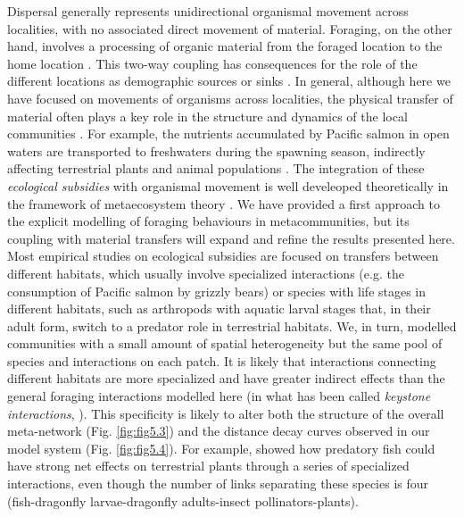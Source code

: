Dispersal generally represents unidirectional organismal movement across localities, with no associated direct movement of material. Foraging, on the other hand, involves a processing of organic material from the foraged location to the home location \citep{Gounand2018}. This two-way coupling has consequences for the role of the different locations as demographic sources or sinks \citep{Gravel2010}. In general, although here we have focused on movements of organisms across localities, the physical transfer of material often plays a key role in the structure and dynamics of the local communities \citep{Polis1997}. For example, the nutrients accumulated by Pacific salmon in open waters are transported to freshwaters during the spawning season, indirectly affecting terrestrial plants and animal populations \citep{Naiman2002, Levi2012}. The integration of these \textit{ecological subsidies} with organismal movement is well develeoped theoretically in the framework of metaecosystem theory \citep{Loreau2003, Gounand2018}. We have provided a first approach to the explicit modelling of foraging behaviours in metacommunities, but its coupling with material transfers will expand and refine the results presented here. Most empirical studies on ecological subsidies are focused on transfers between different habitats, which usually involve specialized interactions (e.g. the consumption of Pacific salmon by grizzly bears) or species with life stages in different habitats, such as arthropods with aquatic larval stages that, in their adult form, switch to a predator role in terrestrial habitats. We, in turn, modelled communities with a small amount of spatial heterogeneity but the same pool of species and interactions on each patch. It is likely that interactions connecting different habitats are more specialized and have greater indirect effects than the general foraging interactions modelled here (in what has been called \textit{keystone interactions}, \citealt{Helfield2006}). This specificity is likely to alter both the structure of the overall meta-network (Fig. \ref{fig:fig5.3}) and the distance decay curves observed in our model system (Fig. \ref{fig:fig5.4}). For example, \cite{Knight2005} showed how predatory fish could have strong net effects on terrestrial plants through a series of specialized interactions, even though the number of links separating these species is four (fish-dragonfly larvae-dragonfly adults-insect pollinators-plants).

